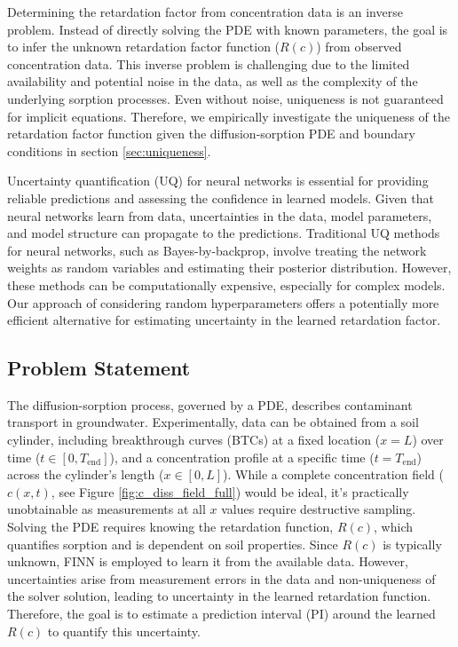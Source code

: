\documentclass{article}
\begin{document}
Determining the retardation factor from concentration data is an inverse problem. Instead of directly solving the PDE with known parameters, the goal is to infer the unknown retardation factor function ($R(c)$) from observed concentration data. This inverse problem is challenging due to the limited availability and potential noise in the data, as well as the complexity of the underlying sorption processes. Even without noise, uniqueness is not guaranteed for implicit equations. Therefore, we empirically investigate the uniqueness of the retardation factor function given the diffusion-sorption PDE and boundary conditions in section \ref{sec:uniqueness}.

Uncertainty quantification (UQ) for neural networks is essential for providing reliable predictions and assessing the confidence in learned models. Given that neural networks learn from data, uncertainties in the data, model parameters, and model structure can propagate to the predictions.
Traditional UQ methods for neural networks, such as Bayes-by-backprop, involve treating the network weights as random variables and estimating their posterior distribution. However, these methods can be computationally expensive, especially for complex models. Our approach of considering random hyperparameters offers a potentially more efficient alternative for estimating uncertainty in the learned retardation factor.




\subsection{Problem Statement}
The diffusion-sorption process, governed by a PDE, describes contaminant transport in groundwater. Experimentally, data can be obtained from a soil cylinder, including breakthrough curves (BTCs) at a fixed location ($x=L$) over time ($t \in [0, T_{\text{end}}]$), and a concentration profile at a specific time ($t=T_{\text{end}}$) across the cylinder's length ($x \in [0,L]$). While a complete concentration field ($c(x,t)$, see Figure \ref{fig:c_diss_field_full}) would be ideal, it's practically unobtainable as measurements at all $x$ values require destructive sampling. Solving the PDE requires knowing the retardation function, $R(c)$, which quantifies sorption and is dependent on soil properties. Since $R(c)$ is typically unknown, FINN is employed to learn it from the available data. However, uncertainties arise from measurement errors in the data and non-uniqueness of the solver solution, leading to uncertainty in the learned retardation function. Therefore, the goal is to estimate a prediction interval (PI) around the learned $R(c)$ to quantify this uncertainty.
\end{document}
